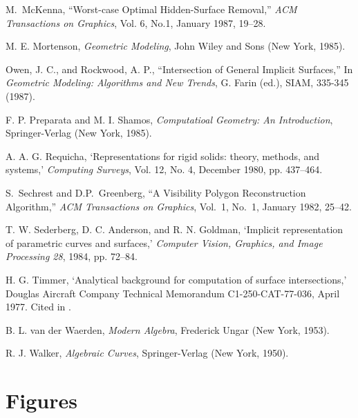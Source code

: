 \begin{thebibliography}{88}
 M.~McKenna, ``Worst-case Optimal Hidden-Surface Removal,''
{\it ACM Transactions on Graphics}, Vol. 6, No.1, January 1987, 19--28.

M. E. Mortenson, 
{\em Geometric Modeling},
John Wiley and Sons (New York, 1985).

 Owen, J. C., and Rockwood, A. P.,
``Intersection of General Implicit Surfaces,''
In {\it Geometric Modeling: Algorithms and New Trends}, G. Farin (ed.),
SIAM, 335-345 (1987).

F. P. Preparata and M. I. Shamos, 
{\em Computatioal Geometry: An Introduction},
Springer-Verlag (New York, 1985).

A. A. G. Requicha, 
`Representations for rigid solids: theory, methods, and systems,'
{\it Computing Surveys}, Vol. 12, No. 4, December 1980, pp. 437--464.

 S.~Sechrest and D.P.~Greenberg, ``A Visibility
Polygon
Reconstruction Algorithm,'' {\it ACM Transactions on Graphics},
Vol.~1, No.~1, January 1982, 25--42.

T. W. Sederberg, D. C. Anderson, and R. N. Goldman,
`Implicit representation of parametric curves and surfaces,'
{\it Computer Vision, Graphics, and Image Processing 28}, 1984, pp. 72--84.

H. G. Timmer, 
`Analytical background for computation of surface intersections,'
Douglas Aircraft Company Technical Memorandum C1-250-CAT-77-036, April 1977.
Cited in \cite{Mort85}. 

B. L. van der Waerden, 
{\em Modern Algebra},
Frederick Ungar (New York, 1953).

 R. J. Walker,
{\em Algebraic Curves},
Springer-Verlag (New York, 1950).

\end{thebibliography}
\clearpage
\section*{Figures}






